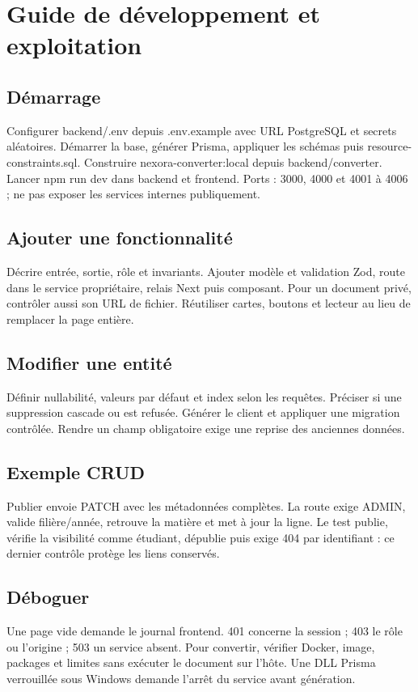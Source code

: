 \chapter{Guide de développement et exploitation}
\section{Démarrage}
Configurer backend/.env depuis .env.example avec URL PostgreSQL et secrets aléatoires. Démarrer la base, générer Prisma, appliquer les schémas puis resource-constraints.sql. Construire nexora-converter:local depuis backend/converter. Lancer npm run dev dans backend et frontend. Ports : 3000, 4000 et 4001 à 4006 ; ne pas exposer les services internes publiquement.

\section{Ajouter une fonctionnalité}
Décrire entrée, sortie, rôle et invariants. Ajouter modèle et validation Zod, route dans le service propriétaire, relais Next puis composant. Pour un document privé, contrôler aussi son URL de fichier. Réutiliser cartes, boutons et lecteur au lieu de remplacer la page entière.

\section{Modifier une entité}
Définir nullabilité, valeurs par défaut et index selon les requêtes. Préciser si une suppression cascade ou est refusée. Générer le client et appliquer une migration contrôlée. Rendre un champ obligatoire exige une reprise des anciennes données.

\section{Exemple CRUD}
Publier envoie PATCH avec les métadonnées complètes. La route exige ADMIN, valide filière/année, retrouve la matière et met à jour la ligne. Le test publie, vérifie la visibilité comme étudiant, dépublie puis exige 404 par identifiant : ce dernier contrôle protège les liens conservés.

\section{Déboguer}
Une page vide demande le journal frontend. 401 concerne la session ; 403 le rôle ou l’origine ; 503 un service absent. Pour convertir, vérifier Docker, image, packages et limites sans exécuter le document sur l’hôte. Une DLL Prisma verrouillée sous Windows demande l’arrêt du service avant génération.

